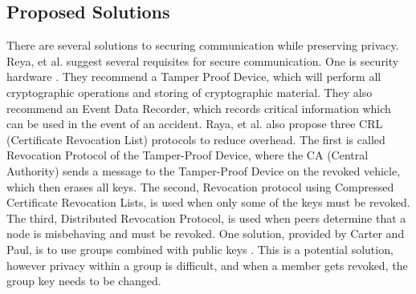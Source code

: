 \documentclass {article}
\begin{document}
\subsection{Proposed Solutions}
There are several solutions to securing communication while preserving privacy. Reya, et al. suggest several requisites for secure communication. One is security hardware \autocite{SecVeComs}. They recommend a Tamper Proof Device, which will perform all cryptographic operations and storing of cryptographic material. They also recommend an Event Data Recorder, which records critical information which can be used in the event of an accident. Raya, et al. also propose three CRL (Certificate Revocation List) protocols to reduce overhead. The first is called Revocation Protocol of the Tamper-Proof Device, where the CA (Central Authority) sends a message to the Tamper-Proof Device on the revoked vehicle, which then erases all keys. The second, Revocation protocol using Compressed Certificate Revocation Lists, is used when only some of the keys must be revoked. The third, Distributed Revocation Protocol, is used when peers determine that a node is misbehaving and must be revoked. One solution, provided by Carter and Paul, is to use groups combined with public keys \autocite{V_BasedSecOps}. This is a potential solution, however privacy within a group is difficult, and when a member gets revoked, the group key needs to be changed. 
\end{document}
